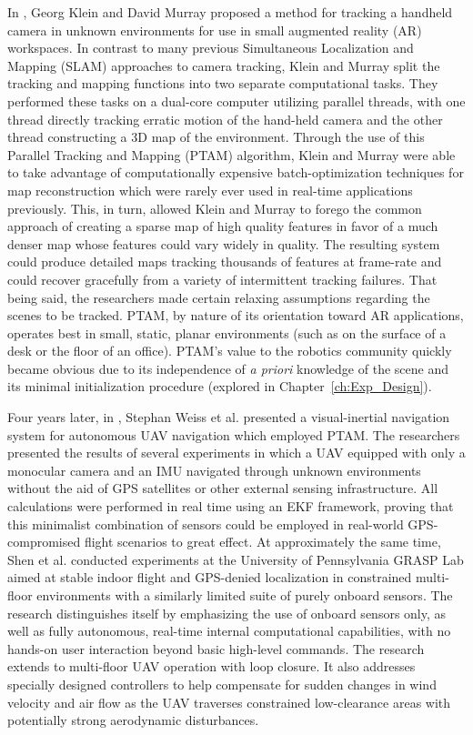 In \cite{Klein2007}, Georg Klein and David Murray proposed a method for tracking a handheld camera in unknown environments for use in small augmented reality (AR) workspaces. In contrast to many previous Simultaneous Localization and Mapping (SLAM) approaches to camera tracking, Klein and Murray split the tracking and mapping functions into two separate computational tasks. They performed these tasks on a dual-core computer utilizing parallel threads, with one thread directly tracking erratic motion of the hand-held camera and the other thread constructing a 3D map of the environment. Through the use of this Parallel Tracking and Mapping (PTAM) algorithm, Klein and Murray were able to take advantage of computationally expensive batch-optimization techniques for map reconstruction which were rarely ever used in real-time applications previously. This, in turn, allowed Klein and Murray to forego the common approach of creating a sparse map of high quality features in favor of a much denser map whose features could vary widely in quality. The resulting system could produce detailed maps tracking thousands of features at frame-rate and could recover gracefully from a variety of intermittent tracking failures. That being said, the researchers made certain relaxing assumptions regarding the scenes to be tracked. PTAM, by nature of its orientation toward AR applications, operates best in small, static, planar environments (such as on the surface of a desk or the floor of an office). PTAM's value to the robotics community quickly became obvious due to its independence of \textit{a priori} knowledge of the scene and its minimal initialization procedure (explored in Chapter~\ref{ch:Exp_Design}). 

Four years later, in \cite{Weiss2011}, Stephan Weiss et al. presented a visual-inertial navigation system for autonomous UAV navigation which employed PTAM. The researchers presented the results of several experiments in which a UAV equipped with only a monocular camera and an IMU navigated through unknown environments without the aid of GPS satellites or other external sensing infrastructure. All calculations were performed in real time using an EKF framework, proving that this minimalist combination of sensors could be employed in real-world GPS-compromised flight scenarios to great effect. At approximately the same time, Shen et al. \cite{Shen2011} conducted experiments at the University of Pennsylvania GRASP Lab aimed at stable indoor flight and GPS-denied localization in constrained multi-floor environments with a similarly limited suite of purely onboard sensors. The research distinguishes itself by emphasizing the use of onboard sensors only, as well as fully autonomous, real-time internal computational capabilities, with no hands-on user interaction beyond basic high-level commands. The research extends to multi-floor UAV operation with loop closure. It also addresses specially designed controllers to help compensate for sudden changes in wind velocity and air flow as the UAV traverses constrained low-clearance areas with potentially strong aerodynamic disturbances.


